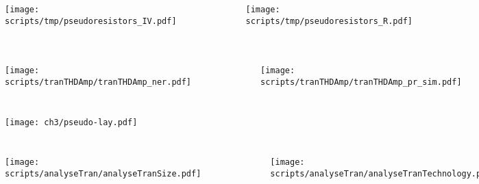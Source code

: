 \begin{frame}{}
    \begin{columns}
        \begin{figure}[H]
            \centering
            \texttt{[image: scripts/tmp/pseudoresistors\_IV.pdf]}
                \end{figure}
        \begin{figure}[H]
            \centering
            \texttt{[image: scripts/tmp/pseudoresistors\_R.pdf]}
        \end{figure}
    \end{columns}

\end{frame}



\begin{frame}{}
    \begin{columns}
        \begin{figure}[H]
            \centering
            \texttt{[image: scripts/tranTHDAmp/tranTHDAmp\_ner.pdf]}
        \end{figure}
        \begin{figure}[H]
            \centering
            \texttt{[image: scripts/tranTHDAmp/tranTHDAmp\_pr\_sim.pdf]}
        \end{figure}
    \end{columns}

\end{frame}



\begin{frame}{}
    \begin{figure}[H]
        \centering
        \texttt{[image: ch3/pseudo-lay.pdf]} 

    \end{figure}
    

\end{frame}



\begin{frame}{}
    \begin{columns}
        \begin{figure}[H]
            \centering
            \texttt{[image: scripts/analyseTran/analyseTranSize.pdf]}
        \end{figure}
        \begin{figure}[H]
            \centering
            \texttt{[image: scripts/analyseTran/analyseTranTechnology.pdf]}
        \end{figure}
    \end{columns}

\end{frame}

